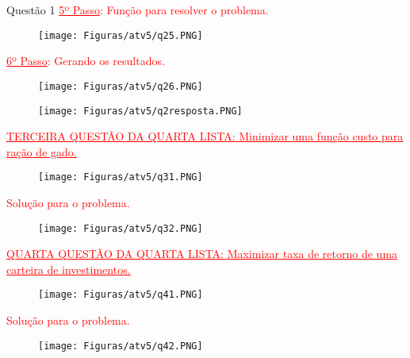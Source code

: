 \documentclass[12pt]{article}
\begin{document}
\begin{section}{Questão 1}
\noindent \textcolor{red}{\underline{5º Passo}: Função para resolver o problema.}

\begin{figure}[H]
    \centering
    \texttt{[image: Figuras/atv5/q25.PNG]}
\end{figure}

\noindent \textcolor{red}{\underline{6º Passo}: Gerando os resultados.}

\begin{figure}[H]
    \centering
    \texttt{[image: Figuras/atv5/q26.PNG]}
\end{figure}

\begin{figure}[H]
    \centering
    \texttt{[image: Figuras/atv5/q2resposta.PNG]}
\end{figure}

\noindent \textcolor{red}{\underline{\underline{TERCEIRA QUESTÃO DA QUARTA LISTA: Minimizar uma função custo para ração de gado.}}}

\begin{figure}[H]
    \centering
    \texttt{[image: Figuras/atv5/q31.PNG]}
\end{figure}

\noindent \textcolor{red}{Solução para o problema.}

\begin{figure}[H]
    \centering
    \texttt{[image: Figuras/atv5/q32.PNG]}
\end{figure}

\noindent \textcolor{red}{\underline{\underline{QUARTA QUESTÃO DA QUARTA LISTA: Maximizar taxa de retorno de uma carteira de investimentos.}}}

\begin{figure}[H]
    \centering
    \texttt{[image: Figuras/atv5/q41.PNG]}
\end{figure}

\noindent \textcolor{red}{Solução para o problema.}

\begin{figure}[H]
    \centering
    \texttt{[image: Figuras/atv5/q42.PNG]}
\end{figure}

\end{section}
\newpage
\end{document}
